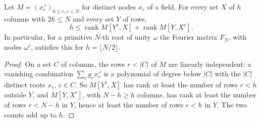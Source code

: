 \begin{lemma}
  \label{lem:lowerbounds-algebraic-dft-half-cut}
  \leanok
  Let $M=(x_c^{\,r})_{0\le r,c<N}$ for distinct nodes $x_c$ of a field. For every set $X$ of $h$
  columns with $2h\le N$ and every set $Y$ of rows,
  \[
    h\le\operatorname{rank}M[Y^c,X]+\operatorname{rank}M[Y,X^c].
  \]
  In particular, for a primitive $N$-th root of unity $\omega$ the Fourier matrix $F_N$, with
  nodes $\omega^c$, satisfies this for $h=\lfloor N/2\rfloor$.
\end{lemma}
\begin{proof}
  \leanok
  On a set $C$ of columns, the rows $r<|C|$ of $M$ are linearly independent: a vanishing
  combination $\sum_rg_rx_c^{\,r}$ is a polynomial of degree below $|C|$ with the $|C|$ distinct
  roots $x_c$, $c\in C$. So $M[Y^c,X]$ has rank at least the number of rows $r<h$ outside $Y$,
  and $M[Y,X^c]$, with $N-h\ge h$ columns, has rank at least the number of rows $r<N-h$ in $Y$,
  hence at least the number of rows $r<h$ in $Y$. The two counts add up to $h$.
\end{proof}

